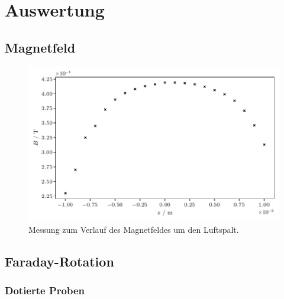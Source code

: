 \section{Auswertung}
\label{sec:auswertung}

\cite{matplotlib} \cite{numpy}

\subsection{Magnetfeld}

\begin{table}[H]
	\centering
	\caption{}
	
	\label{tab:feld}
\end{table}

\begin{figure}[H]
    \centering
    \includegraphics{build/field.pdf}
    \caption{Messung zum Verlauf des Magnetfeldes um den Luftspalt.}
    \label{fig:feld}
\end{figure}

\subsection{Faraday-Rotation}

\begin{table}[H]
	\centering
	\caption{}
	
	\label{tab:proben}
\end{table}

\subsubsection{Dotierte Proben}


